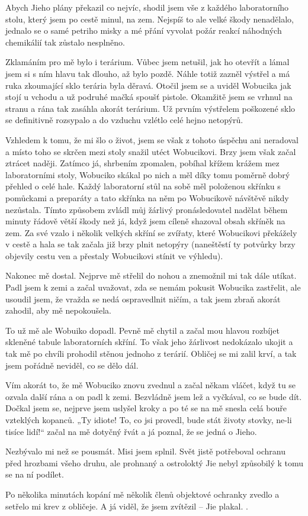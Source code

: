 Abych Jieho plány překazil co nejvíc, shodil jsem vše z každého laboratorního stolu, který jsem po cestě minul, na zem. Nejspíš to ale velké škody nenadělalo, jednalo se o samé petriho misky a mé přání vyvolat požár reakcí náhodných chemikálií tak zůstalo nesplněno.

Zklamáním pro mě bylo i terárium. Vůbec jsem netušil, jak ho otevřít a lámal jsem si s ním hlavu tak dlouho, až bylo pozdě. Náhle totiž zazněl výstřel a má ruka zkoumající sklo terária byla děravá. Otočil jsem se a uviděl Wobucika jak stojí u vchodu a už podruhé mačká spoušť pistole. Okamžitě jsem se vrhnul na stranu a rána tak zasáhla akorát terárium. Už prvním výstřelem poškozené sklo se definitivně rozsypalo a do vzduchu vzlétlo celé hejno netopýrů.

Vzhledem k tomu, že mi šlo o život, jsem se však z tohoto úspěchu ani neradoval a místo toho se skrčen mezi stoly snažil utéct Wobucikovi. Brzy jsem však začal ztrácet naději. Zatímco já, shrbením zpomalen, pobíhal křížem krážem mez laboratorními stoly, Wobuciko skákal po nich a měl díky tomu poměrně dobrý přehled o celé hale. Každý laboratorní stůl na sobě měl položenou skřínku s pomůckami a preparáty a tato skřínka na něm po Wobucikově návštěvě nikdy nezůstala. Tímto způsobem zvládl můj žárlivý pronásledovatel nadělat během minuty řádově větší škody než já, když jsem cíleně shazoval obsah skříněk na zem. Za své vzalo i několik velkých skříní se zvířaty, které Wobucikovi překážely v cestě a hala se tak začala již brzy plnit netopýry (naneštěstí ty potvůrky brzy objevily cestu ven a přestaly Wobucikovi stínit ve výhledu).

Nakonec mě dostal. Nejprve mě střelil do nohou a znemožnil mi tak dále utíkat. Padl jsem k zemi a začal uvažovat, zda se nemám pokusit Wobucika zastřelit, ale usoudil jsem, že vražda se nedá ospravedlnit ničím, a tak jsem zbraň akorát zahodil, aby mě nepokoušela.

To už mě ale Wobuiko dopadl. Pevně mě chytil a začal mou hlavou rozbíjet skleněné tabule laboratorních skříní. To však jeho žárlivost nedokázalo ukojit a tak mě po chvíli prohodil stěnou jednoho z terárií. Obličej se mi zalil krví, a tak jsem pořádně neviděl, co se dělo dál.

Vím akorát to, že mě Wobuciko znovu zvednul a začal někam vláčet, když tu se ozvala další rána a on padl k zemi.
Bezvládně jsem lež a vyčkával, co se bude dít. Dočkal jsem se, nejprve jsem uslyšel kroky a po té se na mě snesla celá bouře vzteklých kopanců. „Ty idiote! To, co jsi provedl, bude stát životy stovky, ne-li tisíce lidí!“ začal na mě dotyčný řvát a já poznal, že se jedná o Jieho.

Nezbývalo mi než se pousmát. Misi jsem splnil. Svět jistě potřeboval ochranu před hrozbami všeho druhu, ale prohnaný a ostroloktý Jie nebyl způsobilý k tomu se na ní podílet. 

Po několika minutách kopání mě několik členů objektové ochranky zvedlo a setřelo mi krev z obličeje. A já viděl, že jsem zvítězil – Jie plakal.
.
